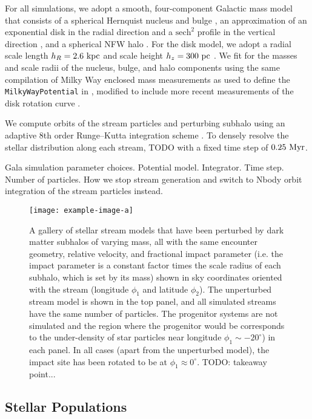 For all simulations, we adopt a smooth, four-component Galactic mass model that consists
of a spherical Hernquist nucleus and bulge \citep{Hernquist:1992}, an approximation of
an exponential disk in the radial direction and a $\textrm{sech}^2$ profile in the
vertical direction \citep{Smith:2015}, and a spherical NFW halo \citep{Navarro:1996}.
For the disk model, we adopt a radial scale length $h_R = 2.6~\mathrm{kpc}$ and scale height
$h_z = 300~\mathrm{pc}$ \citep{Bland-Hawthorn:2016}. We fit for the masses and scale radii of
the nucleus, bulge, and halo components using the same compilation of Milky Way enclosed
mass measurements as used to define the \texttt{MilkyWayPotential} in \gala
\citep{gala}, modified to include more recent measurements of the disk rotation curve
\citep{Eilers:2019}.

We compute orbits of the stream particles and perturbing subhalo using an adaptive 8th
order Runge--Kutta integration scheme \citep{Hairer:1991}.
To densely resolve the stellar distribution along each stream, TODO
with a fixed time step of $0.25~\mathrm{Myr}$.


Gala simulation parameter choices. Potential model. Integrator. Time step. Number of particles. How we stop stream generation and switch to Nbody orbit integration of the stream particles instead.

\begin{figure*}[!th]
\begin{center}
\texttt{[image: example-image-a]} %
\end{center}
\caption{%
A gallery of stellar stream models that have been perturbed by dark matter subhalos of
varying mass, all with the same encounter geometry, relative velocity, and fractional
impact parameter (i.e. the impact parameter is a constant factor times the scale radius
of each subhalo, which is set by its mass) shown in sky coordinates oriented with the
stream (longitude $\phi_1$ and latitude $\phi_2$).
The unperturbed stream model is shown in the top panel, and all simulated streams have
the same number of particles.
The progenitor systems are not simulated and the region where the progenitor would be
corresponds to the under-density of star particles near longitude $\phi_1 \sim
-20^\circ$) in each panel.
In all cases (apart from the unperturbed model), the impact site has been rotated to be
at $\phi_1 \approx 0^\circ$.
TODO: takeaway point...
\label{fig:simgallery}
}
\end{figure*}

\subsection{Stellar Populations} \label{sec:stellarpops}

